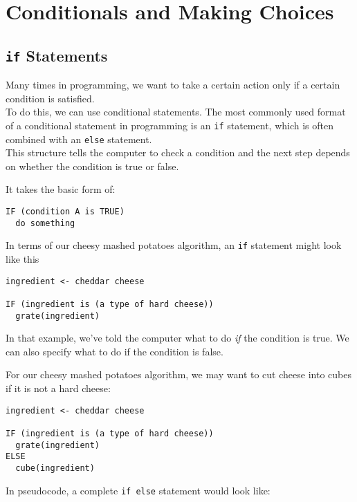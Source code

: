 \documentclass[
]{book}
\begin{document}
\chapter{Conditionals and Making Choices}\label{conditionals-and-making-choices}

\section{\texorpdfstring{\texttt{if} Statements}{if Statements}}\label{if-statements}

Many times in programming, we want to take a certain action only if a certain condition is satisfied.\\

To do this, we can use conditional statements. The most commonly used format of a conditional statement in programming is an \texttt{if} statement, which is often combined with an \texttt{else} statement.\\

This structure tells the computer to check a condition and the next step depends on whether the condition is true or false.

It takes the basic form of:

\begin{verbatim}
IF (condition A is TRUE)
  do something
\end{verbatim}

In terms of our cheesy mashed potatoes algorithm, an \texttt{if} statement might look like this

\begin{verbatim}
ingredient <- cheddar cheese

IF (ingredient is (a type of hard cheese))
  grate(ingredient)
\end{verbatim}

In that example, we've told the computer what to do \emph{if} the condition is true. We can also specify what to do if the condition is false.

For our cheesy mashed potatoes algorithm, we may want to cut cheese into cubes if it is not a hard cheese:

\begin{verbatim}
ingredient <- cheddar cheese

IF (ingredient is (a type of hard cheese))
  grate(ingredient)
ELSE
  cube(ingredient)
\end{verbatim}

In pseudocode, a complete \texttt{if\ else} statement would look like:
\end{document}
